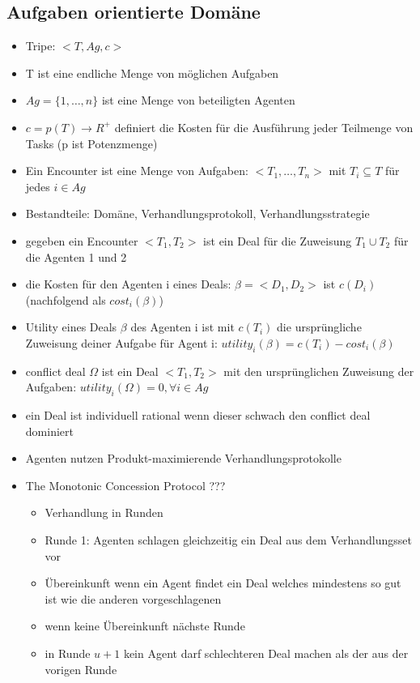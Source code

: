 \documentclass{article} %
\begin{document}
	\subsection{Aufgaben orientierte Domäne}
	\begin{itemize}
		\item Tripe: $<T,Ag,c>$
		\item T ist eine endliche Menge von möglichen Aufgaben
		\item $Ag=\{1,\dots,n\}$ ist eine Menge von beteiligten Agenten
		\item $c = p(T) \rightarrow R^+$ definiert die Kosten für die Ausführung jeder Teilmenge von Tasks (p ist Potenzmenge)
		\item Ein Encounter ist eine Menge von Aufgaben: $<T_1,\dots,T_n>$ mit $T_i \subseteq T$ für jedes $i \in Ag$
		\item Bestandteile: Domäne, Verhandlungsprotokoll, Verhandlungsstrategie
		\item gegeben ein Encounter $<T_1,T_2>$ ist ein Deal für die Zuweisung $T_1 \cup T_2$ für die Agenten 1 und 2
		\item die Kosten für den Agenten i eines Deals: $\beta = <D_1,D_2>$ ist $c(D_i)$ (nachfolgend als $cost_i(\beta)$)
		\item Utility eines Deals $\beta$ des Agenten i ist mit $c(T_i)$ die ursprüngliche Zuweisung deiner Aufgabe für Agent i: $utility_i(\beta) = c(T_i)-cost_i(\beta)$
		\item conflict deal $\Omega$ ist ein Deal $<T_1,T_2>$ mit den ursprünglichen Zuweisung der Aufgaben: $utility_i(\Omega) = 0, \forall i \in Ag$
		\item ein Deal ist individuell rational wenn dieser schwach den conflict deal dominiert
		\item Agenten nutzen Produkt-maximierende Verhandlungsprotokolle
		\item The Monotonic Concession Protocol ???
		\begin{itemize}
			\item Verhandlung in Runden
			\item Runde 1: Agenten schlagen gleichzeitig ein Deal aus dem Verhandlungsset vor
			\item Übereinkunft wenn ein Agent findet ein Deal welches mindestens so gut ist wie die anderen vorgeschlagenen
			\item wenn keine Übereinkunft nächste Runde
			\item in Runde $u+1$ kein Agent darf schlechteren Deal machen als der aus der vorigen Runde

\end{itemize}
\end{itemize}
\end{document}
